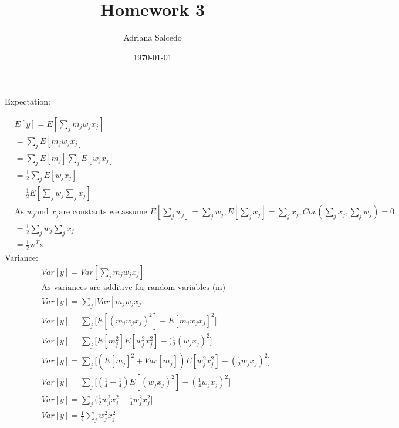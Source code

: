 \documentclass[12pt,letterpaper]{article} %
\title{\Large Homework 3}
\author{\large Adriana Salcedo}
\date{\large \today}
\newcommand{\bs}[1]{\bm{\mathrm{#1}}} %
\newcommand{\sumj}{\sum_j}
\begin{document}
\maketitle
\section{}
\subsection{}
Expectation:

\begin{align}
&E[y] = E[\sum_j m_jw_jx_j] \\
&= \sum_jE[m_jw_jx_j]\\
&= \sum_jE[m_j]\sumj E[w_jx_j]\\
&=\frac{1}{2}\sumj E[w_jx_j]\\
&=\frac{1}{2}E[\sumj w_j\sumj x_j]\\
&\text{As } w_j \text{and } x_j \text{are constants we assume }E[\sumj w_j]=\sumj w_j, E[\sumj x_j]=\sumj x_j, Cov(\sumj x_j,\sumj w_j) = 0\\
&=\frac{1}{2}\sumj w_j \sumj x_j\\
&=\frac{1}{2}\bs{w}^T\bs{x}
\end{align}
Variance:
\begin{align}
&Var[y] = Var[\sum_j m_jw_jx_j] \\
&\text{As variances are additive for random variables (m)}\\
&Var[y] = \sumj\big[ Var[m_jw_jx_j]\big] \\
&Var[y] = \sumj\big[ E[(m_jw_jx_j)^2] - E[m_jw_jx_j]^2\big] \\
&Var[y] = \sumj\big[ E[m_j^2]E[w_j^2x_j^2] - (\frac{1}{2}(w_jx_j)^2\big] \\
&Var[y] = \sumj\big[(E[m_j]^2+Var[m_j])E[w_j^2x_j^2] - (\frac{1}{2}w_jx_j)^2\big] \\
&Var[y] = \sumj\big[(\frac{1}{4}+\frac{1}{4})E[(w_jx_j)^2] - (\frac{1}{4}w_jx_j)^2\big] \\
&Var[y] = \sumj\big(\frac{1}{2}w_j^2x_j^2-\frac{1}{4}w_j^2x_j^2\big] \\
&Var[y] = \frac{1}{4}\sumj w_j^2x_j^2 
\end{align}
\end{document}
